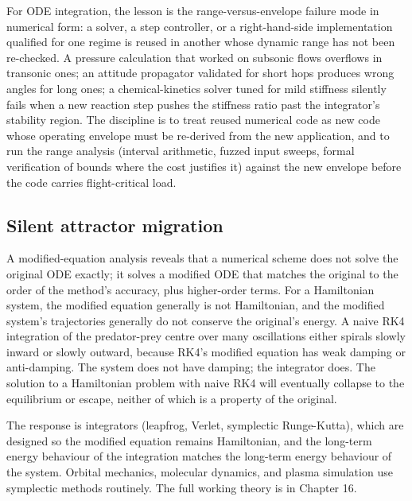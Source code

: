 For ODE integration, the lesson is the range-versus-envelope
failure mode in numerical form: a solver, a step controller, or a
right-hand-side implementation qualified for one regime is reused
in another whose dynamic range has not been re-checked. A pressure
calculation that worked on subsonic flows overflows in transonic
ones; an attitude propagator validated for short hops produces
wrong angles for long ones; a chemical-kinetics solver tuned for
mild stiffness silently fails when a new reaction step pushes the
stiffness ratio past the integrator's stability region. The
discipline is to treat reused numerical code as new code whose
operating envelope must be re-derived from the new application,
and to run the range analysis (interval arithmetic, fuzzed input
sweeps, formal verification of bounds where the cost justifies it)
against the new envelope before the code carries flight-critical
load.

\subsection{Silent attractor migration}

A modified-equation analysis reveals that a numerical scheme does
not solve the original ODE exactly; it solves a modified ODE that
matches the original to the order of the method's accuracy, plus
higher-order terms. For a Hamiltonian system, the modified
equation generally is not Hamiltonian, and the modified system's
trajectories generally do not conserve the original's energy. A
naive RK4 integration of the predator-prey centre over many
oscillations either spirals slowly inward or slowly outward,
because RK4's modified equation has weak damping or anti-damping.
The system does not have damping; the integrator does. The
solution to a Hamiltonian problem with naive RK4 will eventually
collapse to the equilibrium or escape, neither of which is a
property of the original.

The response is  integrators (leapfrog,
Verlet, symplectic Runge-Kutta), which are designed so the
modified equation remains Hamiltonian, and the long-term energy
behaviour of the integration matches the long-term energy
behaviour of the system. Orbital mechanics, molecular dynamics,
and plasma simulation use symplectic methods routinely. The full
working theory is in Chapter 16.

